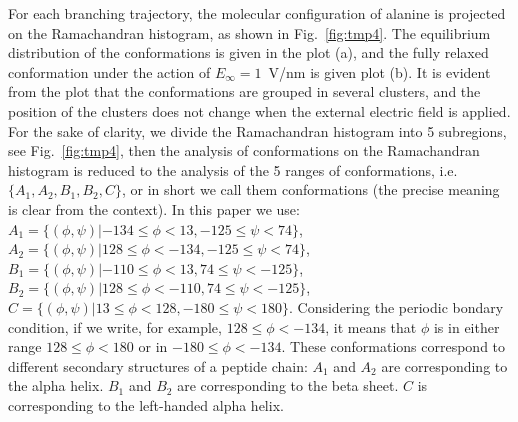 \documentclass[a4paper,preprint,unsortedaddress,onecolumn]{revtex4-1}
\begin{document}
For each branching trajectory,  the molecular configuration of alanine is projected on
the Ramachandran histogram, as
shown in Fig.~\ref{fig:tmp4}. The equilibrium distribution of the
conformations is given in the plot (a), and the fully relaxed
conformation under the action of $E_{\infty} = 1$~V/nm is given  plot (b).  It is
evident from the plot that the conformations are grouped in several clusters, and the
position of the clusters does not change when the external electric
field is applied.
For the sake of clarity, we divide the
Ramachandran histogram into 5 subregions, see Fig.~\ref{fig:tmp4},
then the analysis of conformations on the Ramachandran histogram is reduced to the
analysis of the 5 ranges of conformations, i.e. $\{A_1, A_2, B_1, B_2, C\}$,
or in short we call them conformations (the precise meaning is clear
from the context).
In this paper we use:
$A_1 = \{(\phi, \psi) | -134 \leq \phi <  13, -125 \leq \psi < 74\}$,
$A_2 = \{(\phi, \psi) |  128 \leq \phi <-134, -125 \leq \psi < 74\}$,
$B_1 = \{(\phi, \psi) | -110 \leq \phi <  13,   74 \leq \psi <-125\}$,
$B_2 = \{(\phi, \psi) |  128 \leq \phi <-110,   74 \leq \psi <-125\}$,
$C   = \{(\phi, \psi) |   13 \leq \phi < 128, -180 \leq \psi < 180\}$.
Considering the periodic bondary condition, if we write, for example,
$128 \leq \phi <-134$, it means that $\phi$ is in either range
$128 \leq \phi < 180$ or in $-180 \leq \phi < -134$.
These conformations
correspond to different secondary structures of a peptide chain:
$A_1$ and $A_2$ are
corresponding to the alpha helix. $B_1$ and $B_2$ are
corresponding to the beta sheet. $C$ is corresponding to the
left-handed alpha helix.
\end{document}
